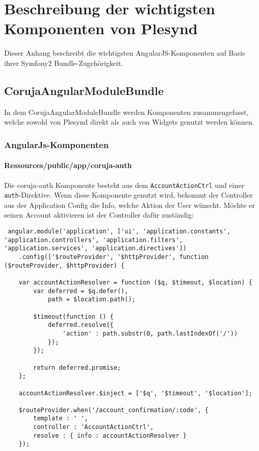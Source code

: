 \chapter{Beschreibung der wichtigsten Komponenten von Plesynd} \label{AppendixC}

Dieser Anhang beschreibt die wichtigsten AngularJS-Komponenten auf Basis ihrer Symfony2 Bundle-Zugehörigkeit.
\section{CorujaAngularModuleBundle}
In dem CorujaAngularModuleBundle werden Komponenten zusammengefasst, welche sowohl von Plesynd direkt als auch von Widgets genutzt werden können. 

\subsection{AngularJs-Komponenten}

\subsubsection*{Ressources/public/app/coruja-auth}\label{section:coruja_auth}
Die coruja-auth Komponente besteht aus dem \texttt{AccountActionCtrl} und einer \texttt{auth}-Direktive. Wenn diese Komponente genutzt wird, bekommt der Controller aus der Application Config die Info, welche Aktion der User wünscht. Möchte er seinen Account aktivieren ist der Controller dafür zuständig:
\begin{lstlisting}
 angular.module('application', ['ui', 'application.constants', 'application.controllers', 'application.filters', 'application.services', 'application.directives'])
    .config(['$routeProvider', '$httpProvider', function ($routeProvider, $httpProvider) {

    var accountActionResolver = function ($q, $timeout, $location) {
        var deferred = $q.defer(),
            path = $location.path();

        $timeout(function () {
            deferred.resolve({
                'action' : path.substr(0, path.lastIndexOf('/'))
            });
        });

        return deferred.promise;
    };

    accountActionResolver.$inject = ['$q', '$timeout', '$location'];

    $routeProvider.when('/account_confirmation/:code', {
        template : ' ',
        controller : 'AccountActionCtrl',
        resolve : { info : accountActionResolver }
    });

\end{lstlisting}

